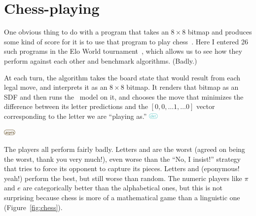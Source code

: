 \documentclass[twocolumn]{article}
\begin{document}


\section{Chess-playing}

\newcommand\deterministic{
  \includegraphics[height=0.8em]{deterministic}
}
\newcommand\asymmetric{
  \includegraphics[height=0.8em]{asymmetric}
}


One obvious thing to do with a program that takes an $8 \times 8$
bitmap and produces some kind of score for it is to use that
program to play chess~\cite{murphy2019blind}. Here I entered
26 such programs in the Elo World tournament~\cite{murphy2019eloworld},
which allows us to see how they perform against each other
and benchmark algorithms. (Badly.)

At each turn, the algorithm takes the board state that would
result from each legal move, and interprets it as an $8 \times 8$
bitmap. It renders that bitmap as an SDF and then runs the
\makelowercase\ model on it, and chooses the move that minimizes
the difference between its letter predictions and the
$[0, 0, \ldots 1, \ldots 0]$ vector corresponding to the letter
we are ``playing as.'' \deterministic \asymmetric

The players all perform fairly badly. Letters  and
 are the worst (agreed on  being the worst,
thank you very much!), even worse than the ``No, I insist!'' strategy
that tries to force its opponent to capture its pieces. Letters
 and  (eponymous! yeah!) perform the best,
but still worse than random. The numeric players like $\pi$ and $e$
are categorically better than the alphabetical ones, but this is not
surprising because chess is more of a mathematical game than a
linguistic one (Figure~\ref{fig:chess}).
\end{document}
